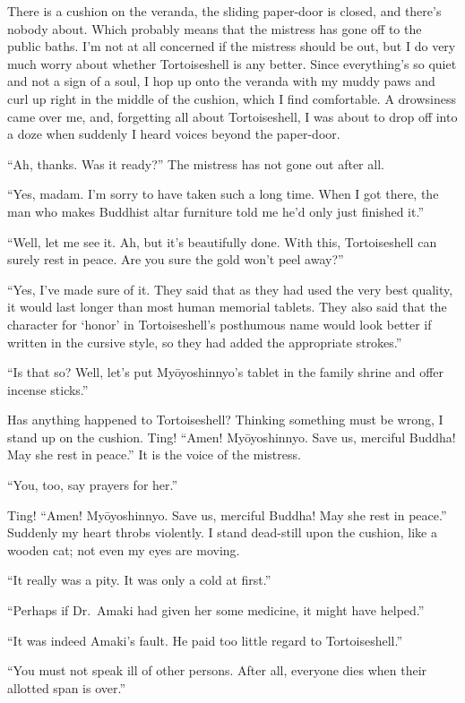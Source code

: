 \documentclass{book}
\begin{document}
There is a cushion on the veranda, the sliding paper-door is closed, and
there's nobody about. Which probably means that the mistress has gone
off to the public baths. I'm not at all concerned if the mistress should
be out, but I do very much worry about whether Tortoiseshell is any
better. Since everything's so quiet and not a sign of a soul, I hop up
onto the veranda with my muddy paws and curl up right in the middle of
the cushion, which I find comfortable. A drowsiness came over me, and,
forgetting all about Tortoiseshell, I was about to drop off into a doze
when suddenly I heard voices beyond the paper-door.

``Ah, thanks. Was it ready?'' The mistress has not gone out after all.

``Yes, madam. I'm sorry to have taken such a long time. When I got
there, the man who makes Buddhist altar furniture told me he'd only just
finished it.''

``Well, let me see it. Ah, but it's beautifully done. With this,
Tortoiseshell can surely rest in peace. Are you sure the gold won't peel
away?''

``Yes, I've made sure of it. They said that as they had used the very
best quality, it would last longer than most human memorial tablets.
They also said that the character for `honor' in Tortoiseshell's
posthumous name would look better if written in the cursive style, so
they had added the appropriate strokes.''

``Is that so? Well, let's put Myōyoshinnyo's tablet in the family shrine
and offer incense sticks.''

Has anything happened to Tortoiseshell? Thinking something must be
wrong, I stand up on the cushion. Ting! ``Amen! Myōyoshinnyo. Save us,
merciful Buddha! May she rest in peace.'' It is the voice of the
mistress.

``You, too, say prayers for her.''

Ting! ``Amen! Myōyoshinnyo. Save us, merciful Buddha! May she rest in
peace.'' Suddenly my heart throbs violently. I stand dead-still upon the
cushion, like a wooden cat; not even my eyes are moving.

``It really was a pity. It was only a cold at first.''

``Perhaps if Dr.~Amaki had given her some medicine, it might have
helped.''

``It was indeed Amaki's fault. He paid too little regard to
Tortoiseshell.''

``You must not speak ill of other persons. After all, everyone dies when
their allotted span is over.''
\end{document}
